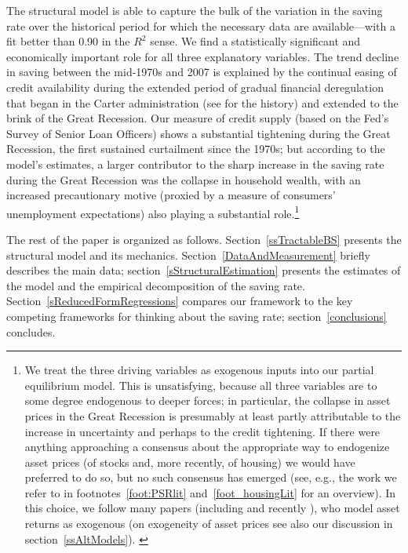 \documentclass[titlepage]{\econtex}
\begin{document}
The structural model is able to capture the bulk of the variation in the saving rate over the historical period for which the necessary data are available---with a fit better than 0.90 in the $R^2$ sense. We find a statistically significant and economically important role for all three explanatory variables. The trend decline in saving between the mid-1970s and 2007 is explained by the continual easing of credit availability during the extended period of gradual financial deregulation that began in the Carter administration (see \cite{wooleyDeregulation} for the history) and extended to the brink of the Great Recession. Our measure of credit supply (based on the Fed's Survey of Senior Loan Officers) shows a substantial tightening during the Great Recession, the first sustained curtailment since the 1970s; but according to the model's estimates, a larger contributor to the sharp increase in the saving rate during the Great Recession was the collapse in household wealth, with an increased precautionary motive (proxied by a measure of consumers' unemployment expectations) also playing a substantial role.\footnote{We treat the three driving variables as exogenous inputs into our partial equilibrium model.  This is unsatisfying, because all three variables are to some degree endogenous to deeper forces; in particular, the collapse in asset prices in the Great Recession is presumably at least partly attributable to the increase in uncertainty and perhaps to the credit tightening.  If there were anything approaching a consensus about the appropriate way to endogenize asset prices (of stocks and, more recently, of housing) we would have preferred to do so, but no such consensus has emerged (see, e.g., the work we refer to in footnotes~\ref{foot:PSRlit} and~\ref{foot_housingLit} for an overview). In this choice, we follow many papers (including \cite{landvoigt:rfs} and recently \cite{krusell:usWealthDistr}), who model asset returns as exogenous (on exogeneity of asset prices see also our discussion in section~\ref{ssAltModels}).
\hypertarget{Exogeneity}{}
}

The rest of the paper is organized as follows. Section~\ref{ssTractableBS} presents the structural model and its mechanics. Section~\ref{DataAndMeasurement} briefly describes the main data; section~\ref{sStructuralEstimation} presents the estimates of the model and the empirical decomposition of the saving rate. Section~\ref{sReducedFormRegressions} compares our framework to the key competing frameworks for thinking about the saving rate; section~\ref{conclusions} concludes.
\end{document}
